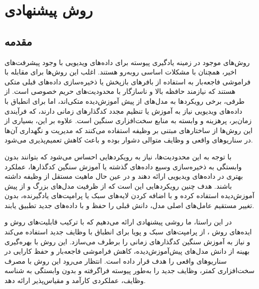 \chapter{روش پیشنهادی}

\section{مقدمه}

روش‌های موجود در زمینه یادگیری پیوسته برای داده‌های ویدیویی با وجود پیشرفت‌های اخیر، همچنان با مشکلات اساسی روبه‌رو هستند. اغلب این روش‌ها برای مقابله با فراموشی فاجعه‌بار به استفاده از بافرهای بازپخش یا ذخیره‌سازی داده‌های قبلی متکی هستند که نیازمند حافظه بالا و ناسازگار با محدودیت‌های حریم خصوصی است. از طرفی، برخی رویکردها به مدل‌های از پیش آموزش‌دیده متکی‌اند، اما برای انطباق با داده‌های ویدیویی نیاز به آموزش یا تنظیم مجدد کدگذارهای زمانی دارند، که فرآیندی زمان‌بر، پرهزینه و وابسته به منابع سخت‌افزاری سنگین است. علاوه بر این، بسیاری از این روش‌ها از ساختارهای مبتنی بر وظیفه
استفاده می‌کنند که مدیریت و نگهداری آن‌ها در سناریوهای واقعی و وظایف متوالی دشوار بوده و باعث کاهش تعمیم‌پذیری می‌شود.

با توجه به این محدودیت‌ها، نیاز به رویکردهایی احساس می‌شود که بتوانند بدون وابستگی به ذخیره‌سازی وسیع داده‌های گذشته یا آموزش سنگین کدگذارها، عملکرد بهتری در داده‌های ویدیویی ارائه دهند و در عین حال ماهیت مستقل از وظیفه
 داشته باشند. هدف چنین رویکردهایی این است که از ظرفیت مدل‌های بزرگ و از پیش آموزش‌دیده استفاده کرده و با اضافه کردن لایه‌های سبک یا پرامپت‌های یادگیرنده، بدون تغییر مستقیم عامل‌های اصلی مدل، دانش قبلی را حفظ و با داده‌های جدید تطبیق یابند.

در این راستا، ما روشی پیشنهادی ارائه می‌دهیم که با ترکیب قابلیت‌های روش  \cite{open-vclip}و ایده‌های روش  \cite{l2p}، از پرامپت‌های سبک و پویا برای انطباق با وظایف جدید استفاده می‌کند و نیاز به آموزش سنگین کدگذارهای زمانی را برطرف می‌سازد. این روش با بهره‌گیری بهینه از دانش مدل‌های پیش‌آموزش‌دیده، کاهش فراموشی فاجعه‌بار و حفظ کارایی در سناریوهای واقعی را هدف قرار داده است. انتظار می‌رود این روش با مصرف سخت‌افزاری کمتر، وظایف جدید را به‌طور پیوسته فراگرفته و بدون وابستگی به شناسه وظایف، عملکردی کارآمد و مقیاس‌پذیر ارائه دهد.

